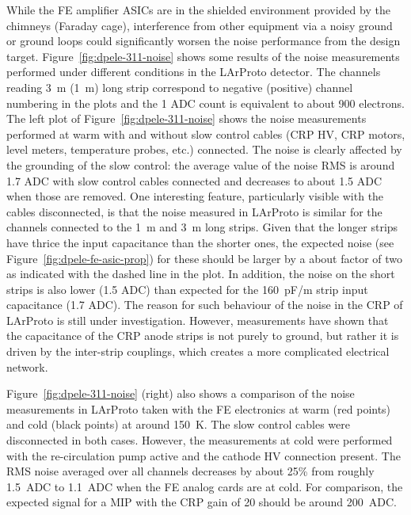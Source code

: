 While the FE amplifier ASICs are in the shielded environment provided by the chimneys (Faraday cage), interference from other equipment via a noisy ground or ground loops could significantly worsen the noise performance from the design target. Figure~\ref{fig:dpele-311-noise} shows some results of the noise measurements performed under different conditions in the LArProto detector. The channels reading \SI{3}{\meter} (\SI{1}{\metre}) long strip correspond to negative (positive) channel numbering in the plots and the 1 ADC count is equivalent to about 900 electrons. The left plot of Figure~\ref{fig:dpele-311-noise} shows the noise measurements performed at warm with and without slow control cables (CRP HV, CRP motors, level meters, temperature probes, etc.) connected. The noise is clearly affected by the grounding of the slow control: the average value of the noise RMS is around \num{1.7} ADC with slow control cables connected and decreases to about \num{1.5} ADC when those are removed. One interesting feature, particularly visible with the cables disconnected, is that the noise measured in LArProto is similar for the channels connected to the \SI{1}{\meter} and \SI{3}{\meter} long strips. Given that the longer strips have thrice the input capacitance than the shorter ones, the expected noise (see Figure~\ref{fig:dpele-fe-asic-prop}) for these should be larger by a about factor of two as indicated with the dashed line in the plot. In addition, the noise on the short strips is also lower (\num{1.5} ADC) than expected for the \SI{160}{pF/m} strip input capacitance (1.7 ADC). The reason for such behaviour of the noise in the CRP of LArProto is still under investigation. However, measurements have shown that the capacitance of the CRP anode strips is not purely to ground, but rather it is driven by the inter-strip couplings, which creates a more complicated electrical network. 

Figure~\ref{fig:dpele-311-noise} (right) also shows a comparison of the noise measurements in LArProto taken with the FE electronics at warm (red points) and cold (black points) at around \SI{150}{\kelvin}. The slow control cables were disconnected in both cases. However, the measurements at cold were performed with the re-circulation pump active and the cathode HV connection present. The RMS noise averaged over all channels decreases by about 25\% from roughly \SI{1.5}{ADC} to \SI{1.1}{ADC} when the FE analog cards are at cold. For comparison, the expected signal for a MIP with the CRP gain of 20 should be around \SI{200}{ADC}. 

